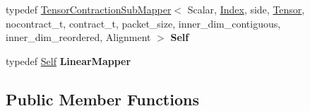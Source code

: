 \begin{DoxyCompactItemize}
typedef \hyperlink{class_eigen_1_1internal_1_1_tensor_contraction_sub_mapper}{Tensor\+Contraction\+Sub\+Mapper}$<$ Scalar, \hyperlink{namespace_eigen_a62e77e0933482dafde8fe197d9a2cfde}{Index}, side, \hyperlink{class_eigen_1_1_tensor}{Tensor}, nocontract\+\_\+t, contract\+\_\+t, packet\+\_\+size, inner\+\_\+dim\+\_\+contiguous, inner\+\_\+dim\+\_\+reordered, Alignment $>$ {\bfseries Self}
\item 
\mbox{\label{class_eigen_1_1internal_1_1_tensor_contraction_sub_mapper_a8b36897baf0f4d73ce75463d844ecd9c}} 
typedef \hyperlink{class_eigen_1_1internal_1_1_tensor_contraction_sub_mapper}{Self} {\bfseries Linear\+Mapper}
\end{DoxyCompactItemize}
\subsection*{Public Member Functions}
